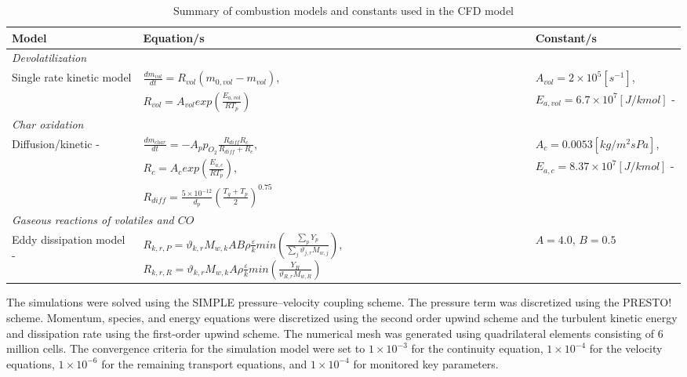 \documentclass[a4paper,fleqn]{cas-dc}
\begin{document}
\begin{table}[h!]
\caption{Summary of combustion models and constants used in the CFD model}\label{tbl_combust}
\begin{tabular*}{\tblwidth}{p{}p{}p{}}
\toprule
Model & Equation/s & Constant/s\\
\midrule
\multicolumn{3}{l}{\textit{Devolatilization}} \\ %
Single rate kinetic model &$\frac{dm_{vol}}{dt} = R_{vol}(m_{0,vol}-m_{vol})$,  & $A_{vol} = 2\times10^5 [s^{-1}]$, \\
& $R_{vol} = A_{vol}exp\left(\frac{E_{a,vol}}{RT_p}\right)$ & $ E_{a,vol} = 6.7\times10^7 [J/kmol]$ - \cite{Sheng2004} \\
\multicolumn{3}{l}{\textit{Char oxidation}} \\
Diffusion/kinetic - \citep{Baum1971} & $\frac{dm_{char}}{dt} = -A_p p_{O_{2}} \frac{R_{diff}R_c}{R_{diff} + R_c}$,  & $A_{c} = 0.0053 [kg/m^2sPa]$, \\
& $R_{c} = A_{c}exp\left(\frac{E_{a,c}}{RT_p}\right)$,  & $E_{a,c} = 8.37\times10^7 [J/kmol]$ - \cite{Sheng2004} \\
& $R_{diff} = \frac{5\times10^{-12}}{d_p} \left(\frac{T_g+T_p}{2}\right)^{0.75}$&\\
\multicolumn{3}{l}{\textit{Gaseous reactions of volatiles and $CO$}} \\
Eddy dissipation model - \cite{Ansys} & $R_{k,r,P} =\vartheta_{k,r}M_{w,k}AB\rho\frac{\varepsilon}{k}min\left(\frac{\sum_{p} Y_p}{\sum_{j}\vartheta_{j,r}M_{w,j}}\right)$, $R_{k,r,R} =\vartheta_{k,r}M_{w,k}A\rho\frac{\varepsilon}{k}min\left(\frac{Y_R}{\vartheta_{R,r}M_{w,R}}\right)$ & $A=4.0$, $B=0.5$\\
\bottomrule
\end{tabular*}
\end{table}

The simulations were solved using the SIMPLE pressure–velocity coupling scheme. The pressure term was discretized using the PRESTO! scheme. Momentum, species, and energy equations were discretized using the second order upwind scheme and the turbulent kinetic energy and dissipation rate using the first-order upwind scheme. The numerical mesh was generated using quadrilateral elements consisting of 6 million cells.  The convergence criteria for the simulation model were set to $1\times10^{-3}$ for the continuity equation, $1\times10^{-4}$ for the velocity equations, $1\times10^{-6}$ for the remaining transport equations, and $1\times10^{-4}$ for monitored key parameters.
\end{document}
